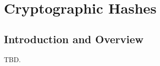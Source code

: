 \chapter{Cryptographic Hashes}
\label{cchs0}

\section{Introduction and Overview}
\label{cchs0:siov0}

TBD.

